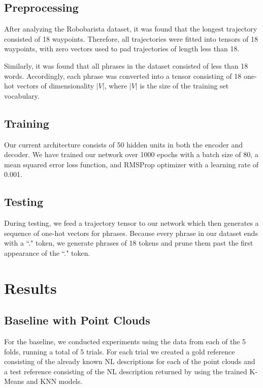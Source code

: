\documentclass[letterpaper, 12 pt, conference]{ieeeconf}
\begin{document}
\subsection{Preprocessing}
After analyzing the Robobarista dataset, it was found  that the longest trajectory consisted of 18 waypoints. Therefore, all trajectories were fitted into tensors of 18 waypoints, with zero vectors used to pad trajectories of length less than 18. 
\par
Similarly, it was found that all phrases in the dataset consisted of less than 18 words. Accordingly, each phrase was converted into a tensor consisting of 18 one-hot vectors of dimensionality $|V|$, where $|V|$ is the size of the training set vocabulary.

\subsection{Training}

Our current architecture consists of 50 hidden units in both the encoder and decoder. We have trained our network over 1000 epochs with a batch size of 80, a mean squared error loss function, and RMSProp optimizer with a learning rate of 0.001. 

\subsection{Testing}

During testing, we feed a trajectory tensor to our network which then generates a sequence of one-hot vectors for phrases. Because every phrase in our dataset ends with a ``." token, we generate phrases of 18 tokens and prune them past the first appearance of the ``." token.  



\section{Results}


\subsection{Baseline with Point Clouds}

For the baseline, we conducted experiments using the data from each of the 5 folds, running a total of 5 trials. For each trial we created a gold reference consisting of the already known NL descriptions for each of the point clouds and a test reference consisting of the NL description returned by using the trained K-Means and KNN models.
\end{document}
